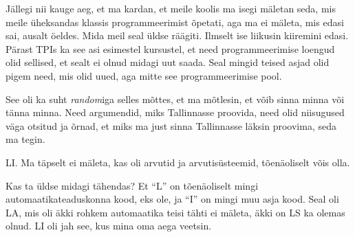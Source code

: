 
Jällegi nii kauge aeg, et ma kardan, et meile koolis ma isegi mäletan seda, mis 
meile üheksandas klassis  programmeerimist õpetati, aga ma ei mäleta, mis edasi 
sai, ausalt öeldes. Mida meil seal üldse räägiti. Ilmselt ise liikusin 
kiiremini edasi. Pärast TPIs 
 ka see asi esimestel kursustel, et need  programmeerimise loengud 
olid  sellised, et sealt ei olnud midagi uut saada. Seal  mingid teised asjad 
olid pigem  need, mis olid uued, aga mitte see programmeerimise pool. 



See oli ka suht \emph{random}iga selles mõttes, et ma mõtlesin, et võib sinna 
minna või tänna minna. Need argumendid, miks  Tallinnasse proovida, need olid 
niisugused väga otsitud ja õrnad, et miks ma just sinna Tallinnasse läksin 
proovima,  seda ma tegin. 


LI. Ma täpselt ei mäleta, kas oli arvutid ja 
arvutisüsteemid, tõenäoliselt võis olla.


Kas ta üldse midagi tähendas? Et \enquote{L} on tõenäoliselt mingi 
automaatikateaduskonna kood, eks ole, ja \enquote{I} on mingi muu asja kood. 
Seal oli LA, mis oli äkki rohkem automaatika teisi tähti ei mäleta, äkki on LS 
ka olemas olnud. LI  oli jah see, kus mina oma aega veetsin.


